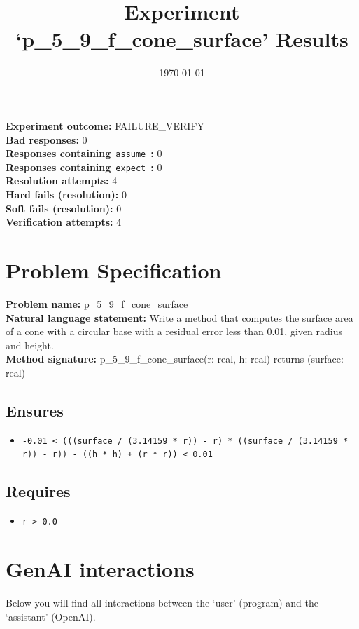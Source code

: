 \documentclass{article}
\begin{document}
\title{Experiment `p\_5\_9\_f\_cone\_surface' Results}
\author{\today}
\date{}
\maketitle
\textbf{Experiment outcome: }FAILURE\_VERIFY
\\\textbf{Bad responses: }0
\\\textbf{Responses containing}~\texttt{assume}~\textbf{: }0
\\\textbf{Responses containing}~\texttt{expect}~\textbf{: }0
\\\textbf{Resolution attempts: }4
\\\textbf{Hard fails (resolution): }0
\\\textbf{Soft fails (resolution): }0
\\\textbf{Verification attempts: }4
\section*{Problem Specification}
\textbf{Problem name: }p\_5\_9\_f\_cone\_surface
\\\textbf{Natural language statement: }Write a method that computes the surface area of a cone with a circular base with a residual error less than 0.01, given radius and height.
\\\textbf{Method signature: }p\_5\_9\_f\_cone\_surface(r: real, h: real) returns (surface: real)
\subsection*{Ensures}
\begin{itemize}
\item \texttt{-0.01 < (((surface / (3.14159 * r)) - r) * ((surface / (3.14159 * r)) - r)) - ((h * h) + (r * r)) < 0.01}
\end{itemize}
\subsection*{Requires}
\begin{itemize}
\item \texttt{r > 0.0}
\end{itemize}
\clearpage
\section*{GenAI interactions}
Below you will find all interactions between the `user' (program) and the `assistant' (OpenAI).
\end{document}

